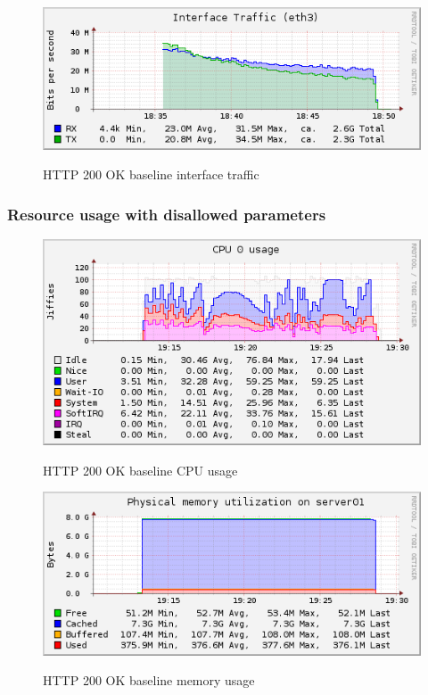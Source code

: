 \documentclass[Measurement results]{subfiles}
\begin{document}
\begin{figure}[H]
\centering
\caption{HTTP 200 OK baseline interface traffic}
\includegraphics[scale=0.7]{images/results/200_with_naxsi_incremented_allowed_parameters/interface.png}
\label{fig:Baseline Nginx interface traffic}
\end{figure}

\subsubsection{Resource usage with disallowed parameters}
\begin{figure}[H]
\centering
\caption{HTTP 200 OK baseline CPU usage}
\includegraphics[scale=0.7]{images/results/200_with_naxsi_incremented_disallowed_parameters/cpu.png}
\label{fig:Baseline Nginx CPU usage}
\end{figure}

\begin{figure}[H]
\centering
\caption{HTTP 200 OK baseline memory usage}
\includegraphics[scale=0.7]{images/results/200_with_naxsi_incremented_disallowed_parameters/memory.png}
\label{fig:Baseline Nginx memory usage}
\end{figure}
\end{document}
